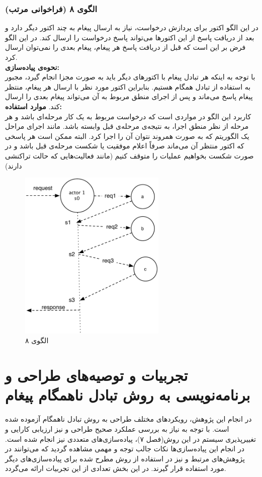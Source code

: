 \subsubsection{الگوی ۸ (فراخوانی مرتب)}
در این الگو اکتور برای پردازش درخواست، نیاز به ارسال پیغام به چند اکتور دیگر دارد و بعد از دریافت پاسخ از این اکتورها می‌تواند پاسخ درخواست را ارسال کند. در این الگو فرض بر این است که قبل از دریافت پاسخ هر پیغام، پیغام بعدی را نمی‌توان ارسال کرد.\\
\textbf{نحوه‌ی پیاده‌سازی:}\\
با توجه به اینکه هر تبادل پیغام با اکتورهای دیگر باید به صورت مجزا انجام گیرد، مجبور به استفاده از تبادل همگام هستیم. بنابراین اکتور مورد نظر با ارسال هر پیغام، منتظر پیغام پاسخ می‌ماند و پس از اجرای منطق مربوط به آن می‌تواند پیغام بعدی را ارسال کند.
\textbf{موارد استفاده:}\\
 کاربرد این الگو در مواردی است که درخواست مربوط به یک کار مرحله‌ای باشد و هر مرحله از نظر منطق اجرا، به نتیجه‌ی مرحله‌ی قبل وابسته باشد. مانند اجرای مراحل یک الگوریتم که به صورت همروند نتوان آن را اجرا کرد. البته ممکن است هر پاسخی که اکتور منتظر آن می‌ماند صرفاً اعلام موفقیت یا شکست مرحله‌ی قبل باشد و در صورت شکست بخواهیم عملیات را متوقف کنیم (مانند فعالیت‌هایی که حالت تراکنشی دارند)
\begin{figure}[ht]
    \begin{center}
	\includegraphics[width=7cm]{4-ProposedFramework/Figures/Patterns_statelfull_rpc.pdf}
    \end{center}
    \caption{\label{fig:Patterns_statefull_8}الگوی ۸}
\end{figure}

\section{ تجربیات و توصیه‌های طراحی و برنامه‌نویسی به روش تبادل ناهمگام پیغام}
در انجام این پژوهش، رویکردهای مختلف طراحی به روش تبادل ناهمگام آزموده شده است. با توجه به نیاز به بررسی عملکرد صحیح طراحی و نیز ارزیابی کارایی و تغییرپذیری سیستم در این روش(فصل ۷)، پیاده‌سازی‌های متعددی نیز انجام شده است. در انجام این پیاده‌سازی‌ها نکات جالب توجه و مهمی مشاهده گردید که می‌توانند در پژوهش‌های مرتبط و نیز در استفاده از روش مطرح شده برای پیاده‌سازی‌های دیگر مورد استفاده قرار گیرند. در این بخش تعدادی از این تجربیات ارائه می‌گردد.
